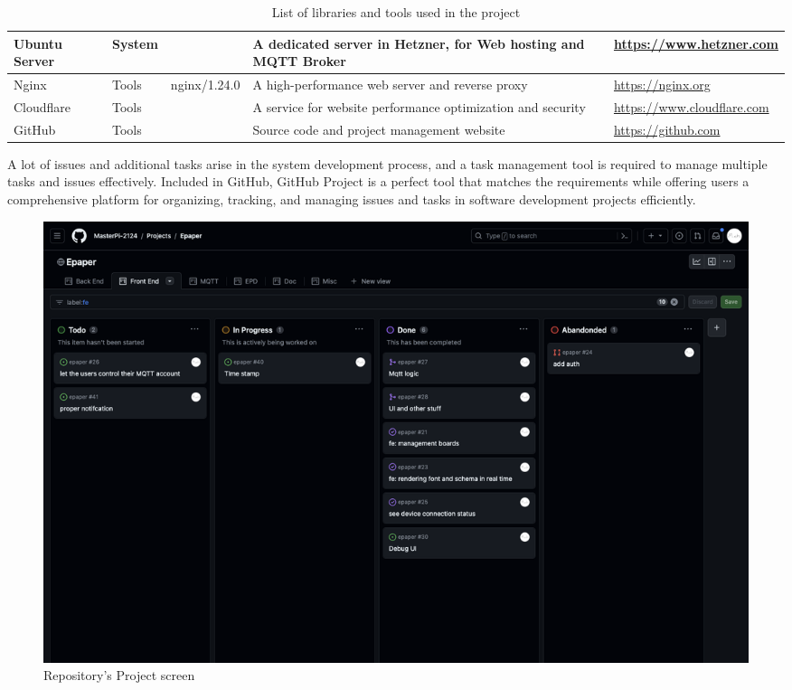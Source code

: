 \documentclass[../Main.tex]{subfiles}
\begin{document}
\begin{table}[H]
\begin{tabular}{| m{3cm} | m{1cm} | m{1.4cm} | m{4cm} | m{4cm} |}
        Ubuntu Server                           & System        &                   & A dedicated server in Hetzner, for Web hosting and MQTT Broker    & \url{https://www.hetzner.com}                                     \\ \hline
        Nginx                                   & Tools         & nginx/1.24.0      & A high-performance web server and reverse proxy                   & \url{https://nginx.org}                                           \\ \hline
        Cloudflare                              & Tools         &                   & A service for website performance optimization and security       & \url{https://www.cloudflare.com}                                  \\ \hline
        GitHub                                  & Tools         &                   & Source code and project management website                        & \url{https://github.com}                      \\ \hline
    \end{tabular}
    \caption{List of libraries and tools used in the project}
    \label{fig:table_tools}
\end{table}

A lot of issues and additional tasks arise in the system development process, and a task management tool is required to manage multiple tasks and issues effectively. Included in GitHub, GitHub Project is a perfect tool that matches the requirements while offering users a comprehensive platform for organizing, tracking, and managing issues and tasks in software development projects efficiently.
\begin{figure}[H]
    \centering
    \includegraphics[width=0.8\linewidth]{doc//imgs/github-projects.png}
    \caption{Repository's Project screen}
    \label{fig:enter-label}
\end{figure}
\end{document}

